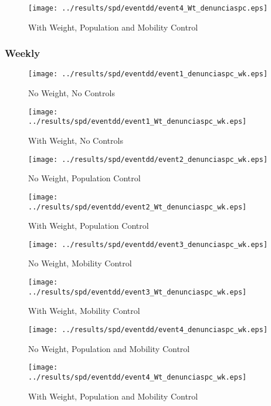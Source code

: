 \documentclass[11pt,letterpaper]{article}
\begin{document}
\begin{figure}[H]
\caption{With Weight, Population and Mobility Control}
\centering
\texttt{[image: ../results/spd/eventdd/event4\_Wt\_denunciaspc.eps]}
\end{figure}

		\subsubsection{Weekly}
\begin{figure}[H]
\caption{No Weight, No Controls}
\centering
\texttt{[image: ../results/spd/eventdd/event1\_denunciaspc\_wk.eps]}
\end{figure}

\begin{figure}[H]
\caption{With Weight, No Controls}
\centering
\texttt{[image: ../results/spd/eventdd/event1\_Wt\_denunciaspc\_wk.eps]}
\end{figure}
\begin{figure}[H]
\caption{No Weight, Population Control}
\centering
\texttt{[image: ../results/spd/eventdd/event2\_denunciaspc\_wk.eps]}
\end{figure}

\begin{figure}[H]
\caption{With Weight, Population Control}
\centering
\texttt{[image: ../results/spd/eventdd/event2\_Wt\_denunciaspc\_wk.eps]}
\end{figure}
\begin{figure}[H]
\caption{No Weight, Mobility Control}
\centering
\texttt{[image: ../results/spd/eventdd/event3\_denunciaspc\_wk.eps]}
\end{figure}

\begin{figure}[H]
\caption{With Weight, Mobility Control}
\centering
\texttt{[image: ../results/spd/eventdd/event3\_Wt\_denunciaspc\_wk.eps]}
\end{figure}
\begin{figure}[H]
\caption{No Weight, Population and Mobility Control}
\centering
\texttt{[image: ../results/spd/eventdd/event4\_denunciaspc\_wk.eps]}
\end{figure}

\begin{figure}[H]
\caption{With Weight, Population and Mobility Control}
\centering
\texttt{[image: ../results/spd/eventdd/event4\_Wt\_denunciaspc\_wk.eps]}
\end{figure}
\end{document}
